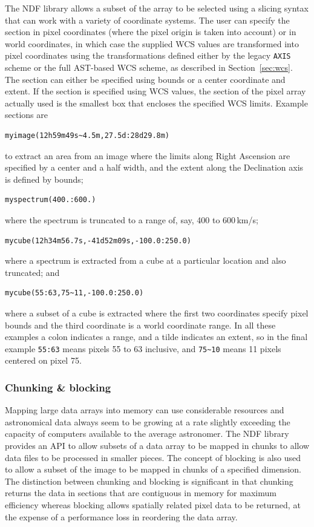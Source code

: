 \documentclass[final,authoryear,5p,times,twocolumn]{elsarticle}
\begin{document}
The NDF library allows a subset of the array to be selected using a
slicing syntax that can work with a variety of coordinate systems. The
user can specify the section in pixel coordinates (where the pixel
origin is taken into account) or in world coordinates, in which case the
supplied WCS values are transformed into pixel coordinates using the
transformations defined either by the legacy \texttt{AXIS} scheme or
the full AST-based WCS scheme, as described in Section~\ref{sec:wcs}.
The section can either be specified using bounds or a center coordinate
and extent. If the section is specified using WCS values, the section of
the pixel array actually used is the smallest box that encloses the
specified WCS limits. Example sections are
\begin{verbatim}
myimage(12h59m49s~4.5m,27.5d:28d29.8m)
\end{verbatim}
to extract an area from an image where the limits along Right
Ascension are specified by a center  and a half width, and the extent
along the Declination axis is defined by bounds;
\begin{verbatim}
myspectrum(400.:600.)
\end{verbatim}
where the spectrum is truncated to a range of, say, 400 to 600\,km/s;
\begin{verbatim}
mycube(12h34m56.7s,-41d52m09s,-100.0:250.0)
\end{verbatim}
where a spectrum is extracted from a cube at a particular location and
also truncated; and
\begin{verbatim}
mycube(55:63,75~11,-100.0:250.0)
\end{verbatim}
where a subset of a cube is extracted where the first two coordinates
specify pixel bounds and the third coordinate is a world coordinate
range. In all these examples a colon indicates a range, and a tilde
indicates an extent, so in the final example \texttt{55:63} means
pixels 55 to 63 inclusive, and \verb|75~10| means 11 pixels centered
on pixel 75.

\subsubsection{Chunking \& blocking}

Mapping large data arrays into memory can use considerable resources
and astronomical data always seem to be growing at a rate slightly
exceeding the capacity of computers available to the average astronomer. The NDF
library provides an API to allow subsets of a data array to be mapped
in chunks to allow data files to be processed in smaller pieces. The
concept of blocking is also used to allow a subset of the image to be
mapped in chunks of a specified dimension. The distinction between
chunking and blocking is significant in that chunking returns the data
in sections that are contiguous in memory for maximum efficiency
whereas blocking allows spatially related pixel data to be returned, at
the expense of a performance loss in reordering the data array.
\end{document}
